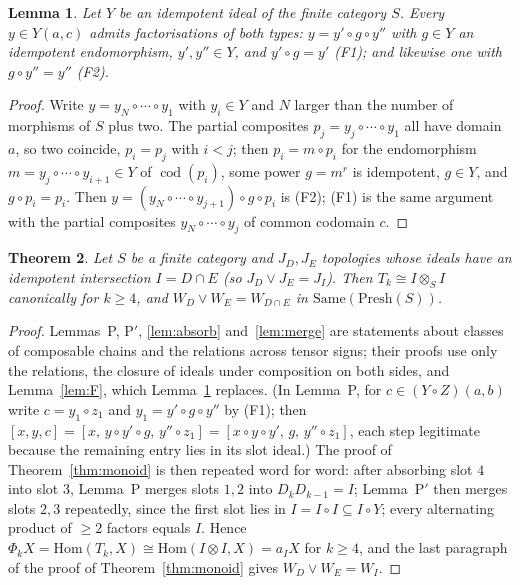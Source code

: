 \documentclass[11pt]{amsart}
\newtheorem{thm}{Theorem}[section]
\newtheorem{lem}[thm]{Lemma}
\theoremstyle{definition}
\newcommand{\Same}{\mathrm{Same}}
\newcommand{\Presh}{\mathrm{Presh}}
\newcommand{\Hom}{\mathrm{Hom}}
\begin{document}
\begin{lem}\label{lem:Fcat}
Let $Y$ be an idempotent ideal of the finite category $S$. Every $y\in Y(a,c)$
admits factorisations of both types: $y=y'\circ g\circ y''$ with $g\in Y$ an
idempotent endomorphism, $y',y''\in Y$, and $y'\circ g=y'$ \textup{(F1)}; and
likewise one with $g\circ y''=y''$ \textup{(F2)}.
\end{lem}
\begin{proof}
Write $y=y_N\circ\cdots\circ y_1$ with $y_i\in Y$ and $N$ larger than the number
of morphisms of $S$ plus two. The partial composites $p_j=y_j\circ\cdots\circ y_1$
all have domain $a$, so two coincide, $p_i=p_j$ with $i<j$; then $p_i=m\circ p_i$
for the endomorphism $m=y_j\circ\cdots\circ y_{i+1}\in Y$ of $\operatorname{cod}(p_i)$,
some power $g=m^r$ is idempotent, $g\in Y$, and $g\circ p_i=p_i$. Then
$y=(y_N\circ\cdots\circ y_{j+1})\circ g\circ p_i$ is (F2); (F1) is the same
argument with the partial composites $y_N\circ\cdots\circ y_j$ of common
codomain $c$.
\end{proof}

\begin{thm}\label{thm:cat}
Let $S$ be a finite category and $J_D,J_E$ topologies whose ideals have an
idempotent intersection $I=D\cap E$ (so $J_D\vee J_E=J_I$). Then
$T_k\cong I\otimes_SI$ canonically for $k\ge4$, and $W_D\vee W_E=W_{D\cap E}$ in
$\Same(\Presh(S))$.
\end{thm}
\begin{proof}
Lemmas~P, P$'$, \ref{lem:absorb} and~\ref{lem:merge} are statements about
classes of composable chains and the relations across tensor signs; their
proofs use only the relations, the closure of ideals under composition on
both sides, and Lemma~\ref{lem:F}, which Lemma~\ref{lem:Fcat} replaces. (In
Lemma~P, for $c\in(Y\circ Z)(a,b)$ write $c=y_1\circ z_1$ and $y_1=y'\circ g\circ y''$
by (F1); then $[x,y,c]=[x,\,y\circ y'\circ g,\,y''\circ z_1]=[x\circ y\circ y',\,g,\,y''\circ z_1]$,
each step legitimate because the remaining entry lies in its slot ideal.)
The proof of Theorem~\ref{thm:monoid} is then repeated word for word: after
absorbing slot $4$ into slot $3$, Lemma~P merges slots $1,2$ into
$D_kD_{k-1}=I$; Lemma~P$'$ then merges slots $2,3$ repeatedly, since the first
slot lies in $I=I\circ I\subseteq I\circ Y$; every alternating product of
$\ge2$ factors equals $I$. Hence $\Phi_kX=\Hom(T_k,X)\cong\Hom(I\otimes I,X)=a_IX$
for $k\ge4$, and the last paragraph of the proof of Theorem~\ref{thm:monoid}
gives $W_D\vee W_E=W_I$.
\end{proof}
\end{document}
